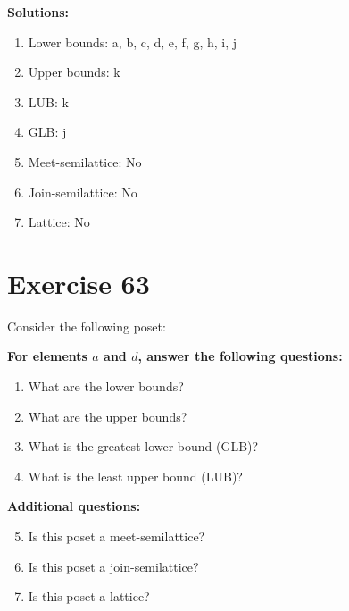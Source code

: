\documentclass{article}
\begin{document}
\textbf{Solutions:}
\begin{enumerate}
    \item Lower bounds: {a, b, c, d, e, f, g, h, i, j}
    \item Upper bounds: {k}
    \item LUB: k
    \item GLB: j
    \item Meet-semilattice: No
    \item Join-semilattice: No
    \item Lattice: No
\end{enumerate}
\newpage
\section*{Exercise 63}
Consider the following poset:
\begin{center}
\end{center}

    \textbf{For elements $a$ and $d$, answer the following questions:}
\begin{enumerate}
    \item What are the lower bounds?
    \item What are the upper bounds?
    \item What is the greatest lower bound (GLB)?
    \item What is the least upper bound (LUB)?
\end{enumerate}
    \hspace*{3ex} \textbf{Additional questions:}
\begin{enumerate}
    \setcounter{enumi}{4}
    \item Is this poset a meet-semilattice?
    \item Is this poset a join-semilattice?
    \item Is this poset a lattice?
\end{enumerate}
\end{document}

